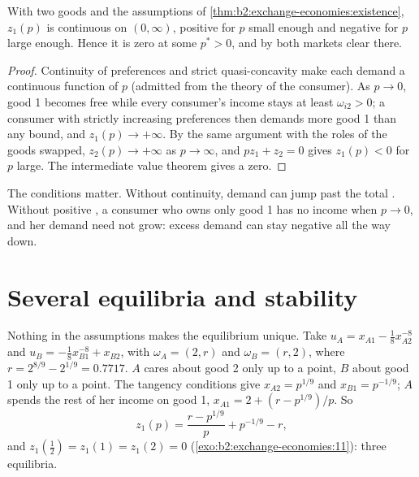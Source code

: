 \begin{proposition}\label{prop:b2:exchange-economies:two-goods}
With two goods and the assumptions of \cref{thm:b2:exchange-economies:existence}, $z_1(p)$ is continuous on
$(0, \infty)$, positive for $p$ small enough and negative for $p$ large enough. Hence it is zero at some
$p^* > 0$, and by  both markets clear there.
\end{proposition}

\begin{proof}
Continuity of preferences and strict quasi-concavity make each demand a continuous function of $p$
(admitted from the theory of the consumer). As $p \to 0$, good 1 becomes free while every consumer's
income stays at least $\omega_{i2} > 0$; a consumer with strictly increasing preferences then demands
more good 1 than any bound, and $z_1(p) \to +\infty$. By the same argument with the roles of the goods
swapped, $z_2(p) \to +\infty$ as $p \to \infty$, and  $pz_1 + z_2 = 0$ gives $z_1(p) < 0$ for
$p$ large. The intermediate value theorem gives a zero.
\end{proof}

The conditions matter. Without continuity, demand can jump past the total . Without positive
, a consumer who owns only good 1 has no income when $p \to 0$, and her demand need not grow:
excess demand can stay negative all the way down.

\section{Several equilibria and stability}\label{sec:b2:exchange-economies:several}

Nothing in the assumptions makes the equilibrium unique. Take $u_A = x_{A1} - \tfrac18 x_{A2}^{-8}$ and
$u_B = -\tfrac18 x_{B1}^{-8} + x_{B2}$, with $\omega_A = (2, r)$ and $\omega_B = (r, 2)$, where $r =
2^{8/9} - 2^{1/9} = 0.7717$. $A$ cares about good 2 only up to a point, $B$ about good 1 only up to a
point. The tangency conditions give $x_{A2} = p^{1/9}$ and $x_{B1} = p^{-1/9}$; $A$ spends the rest of
her income on good 1, $x_{A1} = 2 + (r - p^{1/9})/p$. So
\[
z_1(p) = \frac{r - p^{1/9}}{p} + p^{-1/9} - r ,
\]
and $z_1(\tfrac12) = z_1(1) = z_1(2) = 0$ (\cref{exo:b2:exchange-economies:11}): three equilibria.

